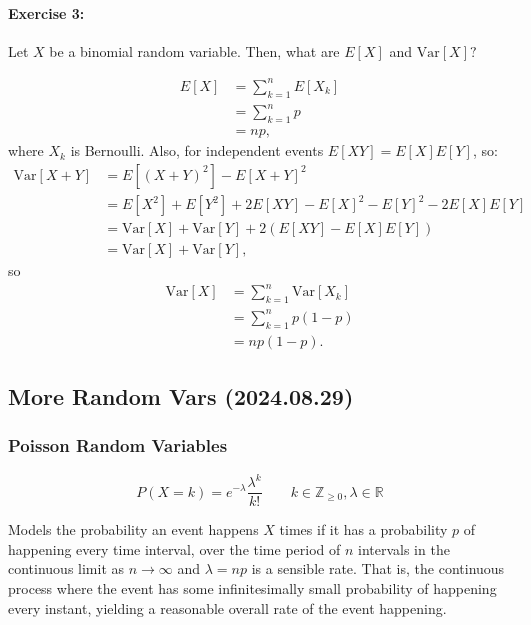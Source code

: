 \documentclass[12pt]{article}
\begin{document}
\begin{itemize}
{    \paragraph{Exercise 3:}
    Let $X$ be a binomial random variable. Then, what are $E[X]$ and $\text{Var}[X]?$

    \begin{align*}
        E[X] &= \sum_{k = 1}^nE[X_k]\\
        &=\sum_{k=1}^np\\
        &=np,
    \end{align*}
    where $X_k$ is Bernoulli. Also, for independent events $E[XY] = E[X]E[Y]$, so:
    \begin{align*}\mathrm{Var}[X+Y] &= E[(X+Y)^2] - E[X+Y]^2 \\&= E[X^2] + E[Y^2] + 2 E[X Y] - E[X]^2 - E[Y]^2 - 2 E[X] E[Y] \\&=\mathrm{Var}[X]+\mathrm{Var}[Y]+2(E[XY]-E[X]E[Y])\\&=\mathrm{Var}[X]+\mathrm{Var}[Y],\end{align*}
    so
    \begin{align*}
        \mathrm{Var}[X] &= \sum_{k=1}^n\mathrm{Var}[X_k]\\
        &=\sum_{k=1}^np(1-p)\\  
        &=np(1-p).
    \end{align*}
    }
\end{itemize}

\subsection{More Random Vars (2024.08.29)}

\subsubsection{Poisson Random Variables}
\[
P(X=k) = e^{-\lambda} \frac{\lambda^k}{k!} \qquad k\in\mathbb{Z}_{\ge 0},\lambda\in\mathbb{R}
\]

Models the probability an event happens $X$ times if it has a probability $p$ of happening every time interval, over the time period of $n$ intervals in the continuous limit as $n\to\infty$ and $\lambda = np$ is a sensible rate. That is, the continuous process where the event has some infinitesimally small probability of happening every instant, yielding a reasonable overall rate of the event happening.
\end{document}
